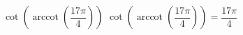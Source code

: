  {$\cot\left(\operatorname{arccot}\left( \dfrac{17\pi}{4} \right)\right)$}
{ $\cot\left(\operatorname{arccot}\left( \dfrac{17\pi}{4} \right)\right) = \dfrac{17\pi}{4}$}
